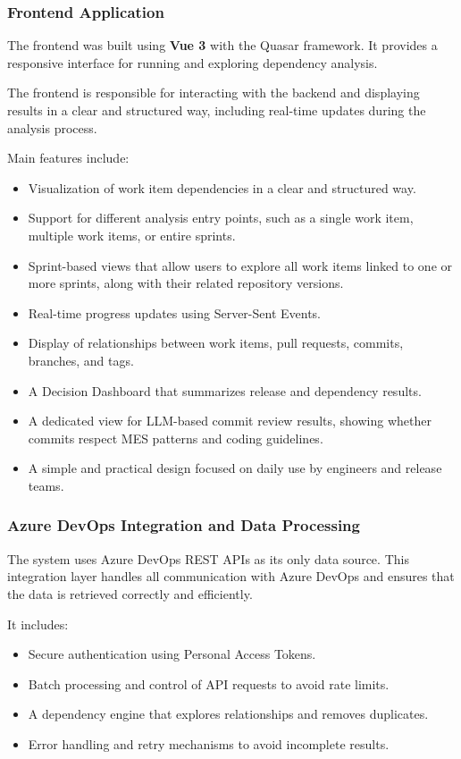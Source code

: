 \subsubsection{Frontend Application}


The frontend was built using \textbf{Vue 3} with the Quasar framework. It
provides a responsive interface for running and exploring dependency analysis.

The frontend is responsible for interacting with the backend and displaying
results in a clear and structured way, including real-time updates during the
analysis process.

Main features include:

\begin{itemize}
  \item Visualization of work item dependencies in a clear and structured way.
  \item Support for different analysis entry points, such as a single work item,
  multiple work items, or entire sprints.
  \item Sprint-based views that allow users to explore all work items linked to
  one or more sprints, along with their related repository versions.
  \item Real-time progress updates using Server-Sent Events.
  \item Display of relationships between work items, pull requests, commits,
  branches, and tags.
  \item A Decision Dashboard that summarizes release and dependency results.
  \item A dedicated view for LLM-based commit review results, showing whether
  commits respect MES patterns and coding guidelines.
  \item A simple and practical design focused on daily use by engineers and
  release teams.
\end{itemize}

\subsubsection{Azure DevOps Integration and Data Processing}

The system uses Azure DevOps REST APIs as its only data source. This integration
layer handles all communication with Azure DevOps and ensures that the data is
retrieved correctly and efficiently.

It includes:

\begin{itemize}
  \item Secure authentication using Personal Access Tokens.
  \item Batch processing and control of API requests to avoid rate limits.
  \item A dependency engine that explores relationships and removes duplicates.
  \item Error handling and retry mechanisms to avoid incomplete results.
\end{itemize}

